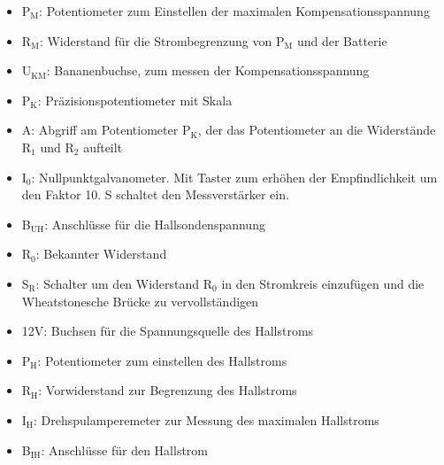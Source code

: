 \documentclass[12pt]{scrartcl}
\begin{document}
\begin{enumerate}
\begin{itemize}
\item
P$_\text{M}$: Potentiometer zum Einstellen der maximalen Kompensationsspannung

\item
R$_\text{M}$: Widerstand für die Strombegrenzung von P$_\text{M}$ und der Batterie

\item
U$_\text{KM}$: Bananenbuchse, zum messen der Kompensationsspannung

\item
P$_\text{K}$: Präzisionspotentiometer mit Skala

\item
A: Abgriff am Potentiometer P$_\text{K}$, der das Potentiometer an die Widerstände R$_\text{1}$ und R$_\text{2}$ aufteilt

\item
I$_\text{0}$: Nullpunktgalvanometer. Mit Taster zum erhöhen der Empfindlichkeit um den Faktor 10. S schaltet den Messverstärker ein.

\item
B$_\text{UH}$: Anschlüsse für die Hallsondenspannung

\item
R$_\text{0}$: Bekannter Widerstand

\item
S$_\text{R}$: Schalter um den Widerstand R$_\text{0}$ in den Stromkreis einzufügen und die Wheatstonesche Brücke zu vervollständigen

\item
12V: Buchsen für die Spannungsquelle des Hallstroms

\item
P$_\text{H}$: Potentiometer zum einstellen des Hallstroms

\item
R$_\text{H}$: Vorwiderstand zur Begrenzung des Hallstroms

\item
I$_\text{H}$: Drehspulamperemeter zur Messung des maximalen Hallstroms

\item
B$_\text{IH}$: Anschlüsse für den Hallstrom

\end{itemize}


\end{enumerate}
\end{document}
